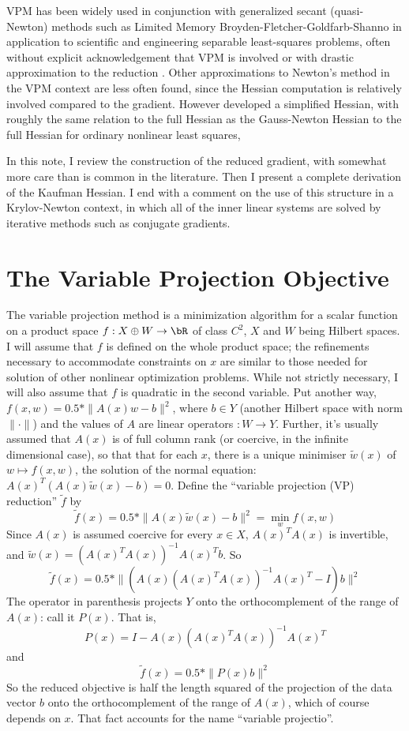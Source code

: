 VPM has been widely used in conjunction with generalized secant (quasi-Newton) methods such as Limited Memory Broyden-Fletcher-Goldfarb-Shanno \cite[]{NocedalWright} in application to scientific and engineering separable least-squares problems, often without explicit acknowledgement that VPM is involved or with drastic approximation to the reduction \cite[]{Ghattas:IP25,LeeuwenHerrmann:16,vanLeeuwenMulder:09,Warner:16}. Other approximations to Newton's method in the VPM context are less often found, since the Hessian computation is relatively involved compared to the gradient. However \cite{Kaufman:75} developed a simplified Hessian, with roughly the same relation to the full Hessian as the Gauss-Newton Hessian to the full Hessian for ordinary nonlinear least squares, 

In this note, I review the construction of the reduced gradient, with somewhat more care than is common in the literature. Then I present a complete derivation of the Kaufman Hessian. I end with a comment on the use of this structure in a Krylov-Newton context, in which all of the inner linear systems are solved by iterative methods such as conjugate gradients. 

\section{The Variable Projection Objective}
The variable projection method is a minimization algorithm for a scalar function on a product space $f:X \oplus W \rightarrow \bR$ of class $C^2$, $X$ and $W$ being Hilbert spaces. I will assume that $f$ is defined on the whole product space; the refinements necessary to accommodate constraints on $x$ are similar to those needed for solution of other nonlinear optimization problems. While not strictly necessary, I will also assume that $f$ is quadratic in the second variable. Put another way, $f(x,w) = 0.5*\|A(x)w-b\|^2$, where $b \in Y$ (another Hilbert space with norm $\|\cdot\|$) and the values of $A$ are linear operators $: W \rightarrow Y$. Further, it's usually assumed that $A(x)$ is of full column rank (or coercive, in the infinite dimensional case), so that that for each $x$, there is a unique minimiser $\tilde{w}(x)$ of $w \mapsto f(x,w)$, the solution of the normal equation: $A(x)^T(A(x)\tilde{w}(x) - b)=0$. Define the ``variable projection (VP) reduction'' $\tilde{f}$ by 
$$
\tilde{f}(x) = 0.5*\|A(x)\tilde{w}(x)-b\|^2= \min_w f(x,w)
$$
Since $A(x)$ is assumed coercive for every $x \in X$, $A(x)^TA(x)$ is invertible, and $\tilde{w}(x) = (A(x)^TA(x))^{-1}A(x)^Tb$. So
$$ 
\tilde{f}(x) = 0.5*\|(A(x)(A(x)^TA(x))^{-1}A(x)^T - I)b\|^2
$$
The operator in parenthesis projects $Y$ onto the orthocomplement of the range of $A(x)$: call it $P(x)$. That is,
\begin{equation}
  \label{eqn:proj}
P(x) = I-A(x)(A(x)^TA(x))^{-1}A(x)^T
\end{equation}
and
$$
\tilde{f}(x) = 0.5*\|P(x)b\|^2
$$
So the reduced objective is half the length squared of the projection of the data vector $b$ onto the orthocomplement of the range of $A(x)$, which of course depends on $x$. That fact accounts for the name ``variable projectio''.

